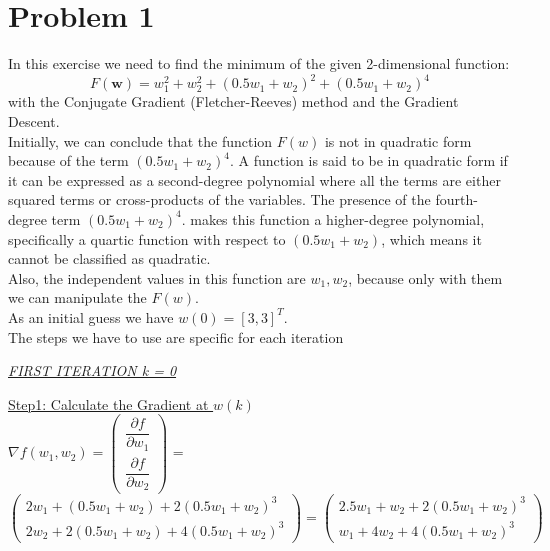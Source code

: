 \section{Problem 1}
In this exercise we need to find the minimum of the given 2-dimensional function:\\
\begin{equation}	
		F(\mathbf{w})=w_{1}^{2}+w_{2}^{2}+(0.5w_{1}+w_{2})^{2}+(0.5w_{1}+w_{2})^{4}
	\label{eq:function1}	
\end{equation}
with the Conjugate Gradient (Fletcher-Reeves) method and the Gradient Descent.\\

Initially, we can conclude that the function $F(w)$ is not in quadratic form because of the term $(0.5w_{1}+w_{2})^{4}$.
A function is said to be in quadratic form if it can be expressed as a second-degree polynomial where all the terms are either squared terms or cross-products of the variables. The presence of the fourth-degree term $(0.5w_{1}+w_{2})^{4}$.
makes this function a higher-degree polynomial, specifically a quartic function with respect to $(0.5w_{1}+w_{2})$, which means it cannot be classified as quadratic.\\
Also, the independent values in this function are $w_{1},w_{2}$, because only with them we can manipulate the $F(w)$.\\ 

As an initial guess we have $w\left(0\right) = \left[3, 3\right]^T$.\\
Τhe steps we have to use are specific for each iteration

\begin{center}
	\underline{\textit{FIRST ITERATION k = 0}}
\end{center}

\underline{Step1: Calculate the Gradient at  $w\left(k\right)$ }\\
\(\nabla f(w_1,w_2) = \left(\begin{array}{c}
	\dfrac{\partial f}{\partial w_1} \\[4mm]
	\dfrac{\partial f}{\partial w_2}
\end{array}\right)\) = $\left(\begin{array}{c}
	2w_1 + (0.5w_1+w_2) + 2(0.5w_1+w_2)^3\\[1mm]
	2w_2 + 2(0.5w_1+w_2) + 4(0.5w_1+w_2)^3
\end{array}\right) = \left(\begin{array}{c}
	2.5w_1 + w_2 + 2(0.5w_1+w_2)^3\\[1mm]
	w_1 + 4w_2 + 4(0.5w_1+w_2)^3
\end{array}\right)$ \\[3mm]

